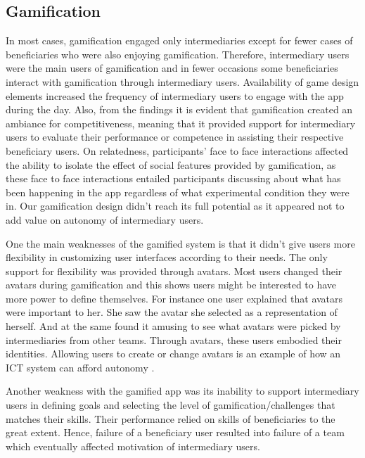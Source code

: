 \documentclass{sig-alternate}
\begin{document}
\subsection*{\textbf{Gamification}} 
In most cases, gamification engaged only intermediaries except for fewer cases of beneficiaries who were also enjoying gamification. Therefore, intermediary users were the main users of gamification and in fewer occasions some beneficiaries interact with gamification through intermediary users. Availability of game design elements increased the frequency of intermediary users to engage with the app during the day. Also, from the findings it is evident that gamification created an ambiance for competitiveness, meaning that it provided support for intermediary users to evaluate their performance or competence in assisting their respective beneficiary users. On relatedness, participants' face to face interactions affected the ability to isolate the effect of social features provided by gamification, as these face to face interactions entailed participants discussing about what has been happening in the app regardless of what experimental condition they were in. Our gamification design didn't reach its full potential as it appeared not to add value on autonomy of intermediary users. 

One the main weaknesses of the gamified system is that it didn't give users more flexibility in customizing user interfaces according to their needs. The only support for flexibility was provided through avatars. Most users changed their avatars during gamification  and this shows users might be interested to have more power to define themselves. For instance one user explained that avatars were important to her. She saw the avatar she selected as a representation of herself. And at the same found it amusing to see what avatars were picked by intermediaries from other teams. Through avatars, these users embodied their identities. Allowing users to create or change avatars is an example of how an ICT system can afford autonomy \cite{zhang2008:motivational}.

Another weakness with the gamified app was its inability to support intermediary users in defining goals and selecting the level of gamification/challenges that matches their skills. Their performance relied on skills of beneficiaries to the great extent. Hence, failure of a beneficiary user resulted into failure of a team which eventually affected motivation of intermediary users.
\end{document}
